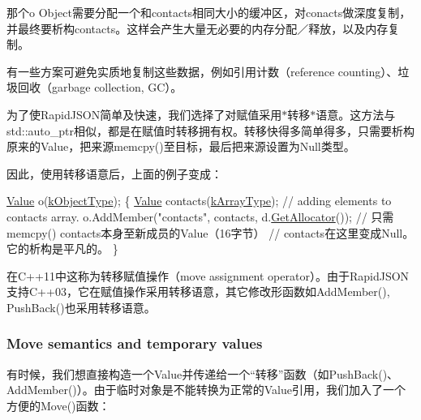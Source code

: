 那个{\ttfamily o} Object需要分配一个和contacts相同大小的缓冲区，对conacts做深度复制，并最终要析构contacts。这样会产生大量无必要的内存分配／释放，以及内存复制。

有一些方案可避免实质地复制这些数据，例如引用计数（reference counting）、垃圾回收（garbage collection, G\+C）。

为了使\+Rapid\+J\+S\+O\+N简单及快速，我们选择了对赋值采用$\ast$转移$\ast$语意。这方法与{\ttfamily std\+::auto\+\_\+ptr}相似，都是在赋值时转移拥有权。转移快得多简单得多，只需要析构原来的\+Value，把来源{\ttfamily memcpy()}至目标，最后把来源设置为\+Null类型。

因此，使用转移语意后，上面的例子变成：


\begin{DoxyCode}
\hyperlink{class_generic_value}{Value} o(\hyperlink{rapidjson_8h_a1d1cfd8ffb84e947f82999c682b666a7a146f46700e905e8df96a6a90b5c7640f}{kObjectType});
\{
    \hyperlink{class_generic_value}{Value} contacts(\hyperlink{rapidjson_8h_a1d1cfd8ffb84e947f82999c682b666a7af41527d6925efa3c5c3dadb23dfef7c8}{kArrayType});
    \textcolor{comment}{// adding elements to contacts array.}
    o.AddMember(\textcolor{stringliteral}{"contacts"}, contacts, d.\hyperlink{class_generic_document_aa4609d6b19f86aec1a6b96edf2c27686}{GetAllocator}());  \textcolor{comment}{// 只需 memcpy()
       contacts本身至新成员的Value（16字节）}
    \textcolor{comment}{// contacts在这里变成Null。它的析构是平凡的。}
\}
\end{DoxyCode}




在\+C++11中这称为转移赋值操作（move assignment operator）。由于\+Rapid\+J\+S\+ON 支持\+C++03，它在赋值操作采用转移语意，其它修改形函数如{\ttfamily Add\+Member()}, {\ttfamily Push\+Back()}也采用转移语意。\hypertarget{md_Cadriciel_Commun_Externe_RapidJSON_doc_tutorial.zh-cn_TemporaryValues}{}\subsubsection{Move semantics and temporary values}\label{md_Cadriciel_Commun_Externe_RapidJSON_doc_tutorial.zh-cn_TemporaryValues}
有时候，我们想直接构造一个\+Value并传递给一个“转移”函数（如{\ttfamily Push\+Back()}、{\ttfamily Add\+Member()}）。由于临时对象是不能转换为正常的\+Value引用，我们加入了一个方便的{\ttfamily Move()}函数：


